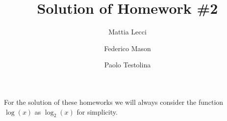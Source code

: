 \documentclass[12pt]{article}
\title{Solution of Homework \#2}
\author{Mattia Lecci \and Federico Mason \and Paolo Testolina}
\numberwithin{equation}{section}
\begin{document}
\maketitle
\thispagestyle{fancyplain}
\flushleft


\justify
For the solution of these homeworks we will always consider the function $\log(x)$ as $\log_2(x)$ for simplicity.








\end{document}

